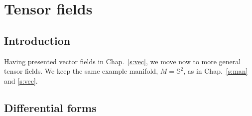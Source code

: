 \chapter{Tensor fields} \label{s:ten}

\minitoc

\section{Introduction}

Having presented vector fields in Chap.~\ref{s:vec}, we move now to more
general tensor fields. We keep the same example manifold, $M = \mathbb{S}^2$,
as in Chap.~\ref{s:man} and \ref{s:vec}.

\section{Differential forms}

